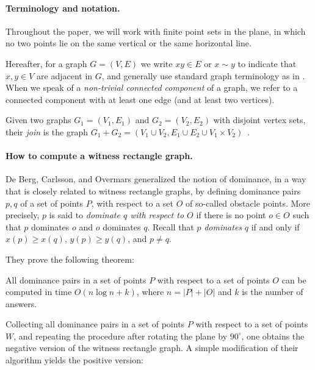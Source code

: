 \documentclass{llncs}
\begin{document}
\paragraph*{Terminology and notation.}
Throughout the paper, we will work with finite point sets in the
plane, in which no two points lie on the same vertical or the same
horizontal line.

Hereafter, for a graph $G=(V,E)$ we write $xy\in E$ or $x\sim y$ to
indicate that $x,y\in V$ are adjacent in $G$, and generally use
standard graph terminology as in \cite{CL04}.
When we speak of a \emph{non-trivial connected component} of a graph,
we refer to a connected component with at least one edge (and at least
two vertices).

Given two graphs $G_1=(V_1,E_1)$ and $G_2=(V_2,E_2)$ with disjoint
vertex sets, their \emph{join} is the graph $G_1+G_2=(V_1 \cup V_2,
E_1\cup E_2 \cup V_1 \times V_2)$~\cite{mathworld:join}.

\paragraph*{How to compute a witness rectangle graph.}

De Berg, Carlsson, and Overmars \cite{BCO92} generalized the notion of 
dominance, in a way that is closely related to witness rectangle graphs, by defining dominance pairs $p,q$ of a set of points $P$, with respect to 
a set $O$ of so-called obstacle points.
More precisely, $p$ is said to \emph{dominate $q$ with respect to $O$} if there is no point $o \in O$ such that $p$ dominates $o$ and $o$ dominates $q$.
Recall that $p$ \emph{dominates} $q$ if and only if $x(p) \geq x(q)$,
$y(p) \geq y(q)$, and $p \neq q$.

They prove the following theorem:




\begin{theorem}
All dominance pairs in a set of points $P$ with respect to a set of points $O$ can be computed in time 
$O(n \log n + k)$, where $n = |P| + |O|$ and $k$ is the number of answers.
\end{theorem}

Collecting all dominance pairs in a set of points $P$ with respect to a set of points $W$, and repeating the procedure after rotating the plane by $90^\circ$, one obtains the negative version of the witness rectangle graph.
A simple modification of their algorithm yields the positive version:
\end{document}
